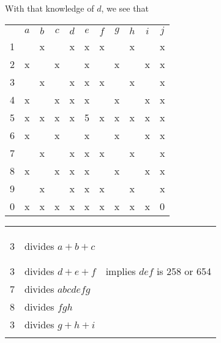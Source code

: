 With that knowledge of $d$, we see that
\begin{center}
\begin{tabular}{ccccccccccc}
			&	$a$	&	$b$	&	$c$	&	$d$	&	$e$	&	$f$	&	$g$	&	$h$	&	$i$	&	$j$	\\
	1		&		&	x	&		&	x	&	x	&	x	&		&	x	&		&	x	\\
	2		&	x	&		&	x	&		&	x	&		&	x	&		&	x	&	x	\\
	3		&		&	x	&		&	x	&	x	&	x	&		&	x	&		&	x	\\
	4		&	x	&		&	x	&	x	&	x	&		&	x	&		&	x	&	x	\\
	5		&	x	&	x	&	x	&	x	&	5	&	x	&	x	&	x	&	x	&	x	\\
	6		&	x	&		&	x	&		&	x	&		&	x	&		&	x	&	x	\\
	7		&		&	x	&		&	x	&	x	&	x	&		&	x	&		&	x	\\
	8		&	x	&		&	x	&	x	&	x	&		&	x	&		&	x	&	x	\\
	9		&		&	x	&		&	x	&	x	&	x	&		&	x	&		&	x	\\
	0		&	x	&	x	&	x	&	x	&	x	&	x	&	x	&	x	&	x	&	0	\\
\end{tabular}
\hspace{1cm}\vline\hspace{1cm}
\begin{tabular}{rll}
	& 		\\
	& 		\\
	& 		\\
	3	&	divides $a+b+c$					\\
	& 		\\
	&		\\
	3	&	divides $d+e+f$			& implies $def$ is 258 or 654		\\
	7	&	divides $abcdefg$				\\
	8	&	divides $fgh$					\\
	3	&	divides $g+h+i$					\\
		&	
\end{tabular}
\end{center}

